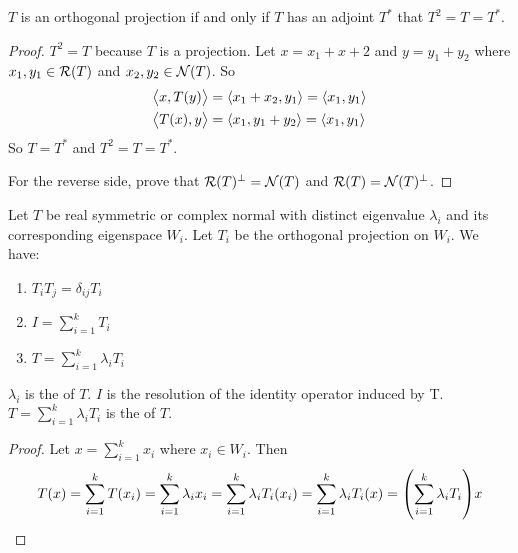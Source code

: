 \begin{theorem}
    $T$ is an orthogonal projection if and only if $T$ has an adjoint $T^*$ that $T^2 = T = T^*$.
\end{theorem}
\begin{proof}
    $T^2 = T$ because $T$ is a projection. Let $x=x_1+x+2$ and $y=y_1+y_2$ where $x_1,y_1 \in \mathcal{R}(T)$ and $x_2,y_2 \in \mathcal{N}(T)$. So
    \begin{equation*}
        \begin{aligned}
            \innerproduct{x}{T(y)} &= \innerproduct{x_1 + x_2}{y_1} = \innerproduct{x_1}{y_1} \\
            \innerproduct{T(x)}{y} &= \innerproduct{x_1}{y_1 + y_2} = \innerproduct{x_1}{y_1}
        \end{aligned}
    \end{equation*}
    So $T = T^*$ and $T^2 = T = T^*$.
    
    For the reverse side, prove that $\mathcal{R}(T)^\bot = \mathcal{N}(T)$ and $\mathcal{R}(T)= \mathcal{N}(T)^\bot$.
\end{proof}

\begin{theorem}
    Let $T$ be real symmetric or complex normal with distinct eigenvalue $\lambda_i$ and its corresponding eigenspace $W_i$. Let $T_i$ be the orthogonal projection on $W_i$. We have:
    \begin{enumerate}
        \item $T_i T_j = \delta_{ij} T_i$
        \item $\displaystyle I = \sum_{i=1}^k T_i$
        \item $\displaystyle T = \sum_{i=1}^k \lambda_i T_i$
    \end{enumerate}
    
    $\lambda_i$ is the  of $T$. $I$ is the resolution of the identity operator induced by T. $\displaystyle T = \sum_{i=1}^k \lambda_i T_i$ is the  of $T$.
\end{theorem}
\begin{proof}
    Let $\displaystyle x= \sum_{i=1}^k x_i$ where $x_i \in W_i$. Then
    \begin{equation*}
        T(x) = \sum_{i=1}^k T(x_i) = \sum_{i=1}^k \lambda_i x_i= \sum_{i=1}^k \lambda_i T_i (x_i) = \sum_{i=1}^k \lambda_i T_i (x) = \mleft(\sum_{i=1}^k \lambda_i T_i \mright) x
    \end{equation*}
\end{proof}

